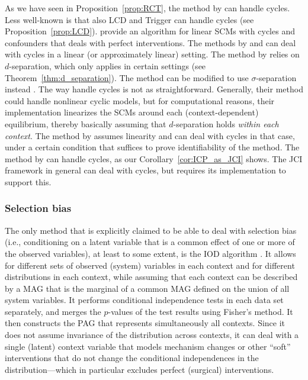 \documentclass[twoside,11pt]{article}
\begin{document}
As we have seen in Proposition~\ref{prop:RCT}, the method by \citet{Fisher1935} can handle cycles. Less well-known is that also
LCD \citep{Cooper1997} and Trigger \citep{Trigger2007} can handle cycles (see Proposition~\ref{prop:LCD}). 
\citet{Hyttinen++2012} provide an 
algorithm for linear SCMs with cycles and confounders that deals with perfect interventions. The methods by
\citet{HEJ2014} and \citet{MooijHeskes_UAI_13} can deal with cycles in a linear (or approximately linear) setting. The method
by \citet{HEJ2014} relies on $d$-separation, which only applies in certain settings (see Theorem~\ref{thm:d_separation}). 
The method can be modified to use $\sigma$-separation instead \citep{ForreMooij_UAI_18}.
The way \citet{MooijHeskes_UAI_13} handle cycles is not as
straightforward. Generally, their method could handle nonlinear cyclic models, but for computational reasons, their implementation
linearizes the SCMs around each (context-dependent) equilibrium, thereby basically assuming that $d$-separation holds 
\emph{within each context}. The method by \citet{Rothenhausler++2015} assumes linearity and can deal with cycles in that case,
under a certain condition that suffices to prove identifiability of the method. The method by \citet{ICP2016} can handle cycles,
as our Corollary~\ref{cor:ICP_as_JCI} shows. The JCI framework in general can deal with cycles, but requires its implementation 
to support this.

\subsubsection{Selection bias}
The only method that is explicitly claimed to be able to deal with selection bias (i.e., conditioning on a latent variable that is a common effect of one or more of the observed variables), at least to some extent, is the IOD algorithm \citep{IOD2011}. It allows for different sets of observed (system) variables in each context and for different distributions in each context, while assuming that each context can be described by a MAG that is the marginal of a common MAG defined on the union of all system variables. %
It performs conditional independence tests in each data set separately, and merges the $p$-values of the test results using Fisher's method. It then constructs the PAG that represents simultaneously all contexts. Since it does not assume invariance of the distribution across contexts, it can deal with a single (latent) context variable that models mechanism changes or other ``soft'' interventions that do not change the conditional independences in the distribution---which in particular excludes perfect (surgical) interventions.
\end{document}
